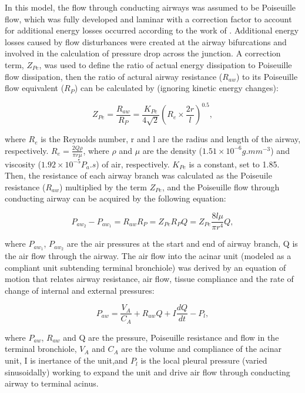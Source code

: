 In this model, the flow through conducting airways was assumed to be Poiseuille flow, which was fully developed and laminar with a correction factor to account for additional energy losses occurred according to the work of \cite{pedley1970energy}. Additional energy losses caused by flow disturbances were created at the airway bifurcations and involved in the calculation of pressure drop across the junction. A correction term, $Z_{Pe}$, was used to define the ratio of actual energy dissipation to Poiseuille flow dissipation, then the ratio of actural airway resistance ($R_{aw}$) to its Poiseuille flow equivalent ($R_P$) can be calculated by (ignoring kinetic energy changes):

\begin{equation}
 \label{eq:EnergyDissipation}
 Z_{Pe} = \frac{R_{aw}}{R_P} = \frac{K_{Pe}}{4\sqrt{2}}(R_e \times \frac{2r}{l})^{0.5},
\end{equation}

\noindent where $R_e$ is the Reynolds number, r and l are the radius and length of the airway, respectively. $R_e = \frac{2Q\rho}{\pi r \mu}$, where $\rho$ and $\mu$ are the density ($1.51 \times 10^{-6}g.mm^{-3}$) and viscosity ($1.92 \times 10^{-5}P_{a}.s$) of air, respectively. $K_{Pe}$ is a constant, set to 1.85. Then, the resistance of each airway branch was calculated as the Poiseuile resistance ($R_{aw}$) multiplied by the term $Z_{Pe}$, and the Poiseuille flow through conducting airway can be acquired by the following equation:

\begin{equation}
 \label{eq:PressureFlowEquation}
 P_{aw_2} - P_{aw_1} = R_{aw}R_P = Z_{Pe}R_PQ = Z_{Pe}\frac{8l\mu}{\pi r^{4}}Q,
\end{equation}

\noindent where $P_{aw_1}$, $P_{aw_2}$ are the air pressures at the start and end of airway branch, Q is the air flow through the airway. The air flow into the acinar unit (modeled as a compliant unit subtending terminal bronchiole) was derived by an equation of motion that relates airway resistance, air flow, tissue compliance and the rate of change of internal and external pressures:

\begin{equation}
 \label{eq:AcinarFlowEquation}
 P_{aw} = \frac{V_A}{C_A} + R_{aw}Q + I\frac{dQ}{dt} - P_l,
\end{equation}

\noindent where $P_{aw}$, $R_{aw}$ and Q are the pressure, Poiseuille resistance and flow in the terminal bronchiole, $V_A$ and $C_A$ are the volume and compliance of the acinar unit, I is inertance of the unit,and $P_l$ is the local pleural pressure (varied sinusoidally) working to expand the unit and drive air flow through conducting airway to terminal acinus.

